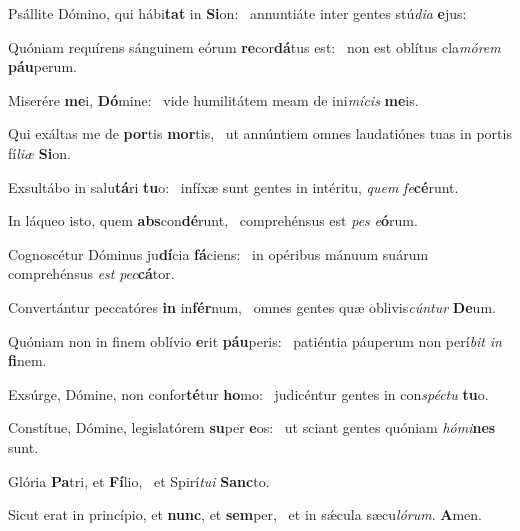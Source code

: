 \item Psállite Dómino, qui hábi\textbf{tat} in \textbf{Si}on:~\psstar{} annuntiáte inter gentes stú\textit{dia} \textbf{e}jus:
\item Quóniam requírens sánguinem eórum \textbf{re}cor\textbf{dá}tus est:~\psstar{} non est oblítus cla\textit{mórem} \textbf{páu}perum.
\item Miserére \textbf{me}i, \textbf{Dó}mine:~\psstar{} vide humilitátem meam de ini\textit{mícis} \textbf{me}is.
\item Qui exáltas me de \textbf{por}tis \textbf{mor}tis,~\psstar{} ut annúntiem omnes laudatiónes tuas in portis fí\textit{liæ} \textbf{Si}on.
\item Exsultábo in salu\textbf{tá}ri \textbf{tu}o:~\psstar{} infíxæ sunt gentes in intéritu, \textit{quem} \textit{fe}\textbf{cé}runt.
\item In láqueo isto, quem \textbf{abs}con\textbf{dé}runt,~\psstar{} comprehénsus est \textit{pes} \textit{e}\textbf{ó}rum.
\item Cognoscétur Dóminus ju\textbf{dí}cia \textbf{fá}ciens:~\psstar{} in opéribus mánuum suárum comprehénsus \textit{est} \textit{pec}\textbf{cá}tor.
\item Convertántur peccatóres \textbf{in} in\textbf{fér}num,~\psstar{} omnes gentes quæ oblivis\textit{cúntur} \textbf{De}um.
\item Quóniam non in finem oblívio \textbf{e}rit \textbf{páu}peris:~\psstar{} patiéntia páuperum non perí\textit{bit} \textit{in} \textbf{fi}nem.
\item Exsúrge, Dómine, non confor\textbf{té}tur \textbf{ho}mo:~\psstar{} judicéntur gentes in con\textit{spéctu} \textbf{tu}o.
\item Constítue, Dómine, legislatórem \textbf{su}per \textbf{e}os:~\psstar{} ut sciant gentes quóniam \textit{hómi}\textbf{nes} sunt.
\item Glória \textbf{Pa}tri, et \textbf{Fí}lio,~\psstar{} et Spirí\textit{tui} \textbf{Sanc}to.
\item Sicut erat in princípio, et \textbf{nunc}, et \textbf{sem}per,~\psstar{} et in sǽcula sæcu\textit{lórum}. \textbf{A}men.
